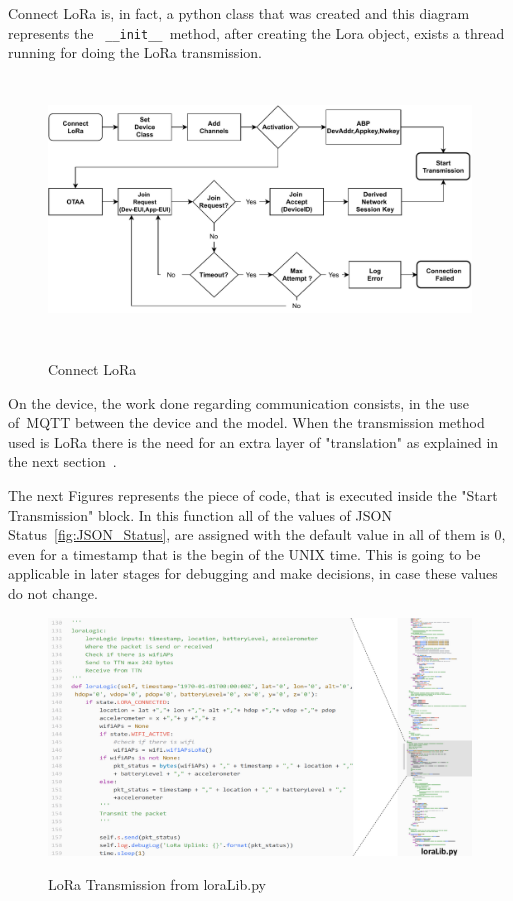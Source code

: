 Connect LoRa is, in fact, a python class that was created and this diagram represents the \verb| __init__ |method, after creating the Lora object, exists a thread running for doing the LoRa transmission.\newline
\begin{figure}[htbp]
  \centering
  
    {\includegraphics[height=7cm,width=\linewidth]{Chapters/Figures/ConnectLoRa.pdf}}%
 
  \caption{Connect LoRa}
  \label{fig:ConnectLoRa}
\end{figure}

On the device, the work done regarding communication consists, in the use of~\gls{MQTT} between the device and the model. When the transmission method used is LoRa there is the need for an extra layer of "translation" as explained in the next section~.

\newpage
The next Figures represents the piece of code, that is executed inside the "Start Transmission"  block. In this function all of the values of JSON Status~\ref{fig:JSON_Status}, are assigned with the default value in all of them is 0, even for a timestamp that is the begin of the UNIX time. This is going to be applicable in later stages for debugging and make decisions, in case these values do not change.
\begin{figure}[htbp]
  \centering
  
    {\includegraphics[width=0.9\linewidth]{Chapters/Figures/loralib.pdf}}%
 
  \caption{LoRa Transmission from loraLib.py~\cite{githubcode}}
  \label{fig:LoRa_Transmit}
\end{figure}

